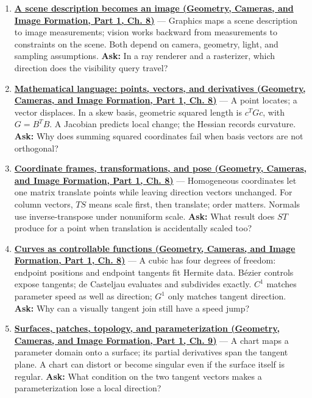 \begin{enumerate}
\def\labelenumi{\arabic{enumi}.}
\item
  \textbf{\href{../03-Geometry-Cameras-and-Image-Formation-P01/main.pdf\#nameddest=03-visual-computing-i-ch001-a-scene-description-becomes-an-image}{A scene description becomes an image (Geometry, Cameras, and Image Formation, Part 1, Ch. 8)}} --- Graphics maps a scene description to image measurements; vision works backward from measurements to constraints on the scene. Both depend on camera, geometry, light, and sampling assumptions. \textbf{Ask:} In a ray renderer and a rasterizer, which direction does the visibility query travel?
\item
  \textbf{\href{../03-Geometry-Cameras-and-Image-Formation-P01/main.pdf\#nameddest=03-visual-computing-i-ch001-mathematical-language-points-vectors-and-derivatives}{Mathematical language: points, vectors, and derivatives (Geometry, Cameras, and Image Formation, Part 1, Ch. 8)}} --- A point locates; a vector displaces. In a skew basis, geometric squared length is \(c^T Gc\), with \(G=B^TB\). A Jacobian predicts local change; the Hessian records curvature. \textbf{Ask:} Why does summing squared coordinates fail when basis vectors are not orthogonal?
\item
  \textbf{\href{../03-Geometry-Cameras-and-Image-Formation-P01/main.pdf\#nameddest=03-visual-computing-i-ch001-coordinate-frames-transformations-and-pose}{Coordinate frames, transformations, and pose (Geometry, Cameras, and Image Formation, Part 1, Ch. 8)}} --- Homogeneous coordinates let one matrix translate points while leaving direction vectors unchanged. For column vectors, \(TS\) means scale first, then translate; order matters. Normals use inverse-transpose under nonuniform scale. \textbf{Ask:} What result does \(ST\) produce for a point when translation is accidentally scaled too?
\item
  \textbf{\href{../03-Geometry-Cameras-and-Image-Formation-P01/main.pdf\#nameddest=03-visual-computing-i-ch001-curves-as-controllable-functions}{Curves as controllable functions (Geometry, Cameras, and Image Formation, Part 1, Ch. 8)}} --- A cubic has four degrees of freedom: endpoint positions and endpoint tangents fit Hermite data. Bézier controls expose tangents; de Casteljau evaluates and subdivides exactly. \(C^1\) matches parameter speed as well as direction; \(G^1\) only matches tangent direction. \textbf{Ask:} Why can a visually tangent join still have a speed jump?
\item
  \textbf{\href{../03-Geometry-Cameras-and-Image-Formation-P01/main.pdf\#nameddest=03-visual-computing-i-ch002-surfaces-patches-topology-and-parameterization}{Surfaces, patches, topology, and parameterization (Geometry, Cameras, and Image Formation, Part 1, Ch. 9)}} --- A chart maps a parameter domain onto a surface; its partial derivatives span the tangent plane. A chart can distort or become singular even if the surface itself is regular. \textbf{Ask:} What condition on the two tangent vectors makes a parameterization lose a local direction?

\end{enumerate}
